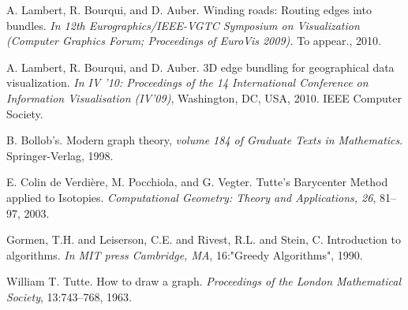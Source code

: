 \begin{thebibliography}{}

 A. Lambert, R. Bourqui, and D. Auber. Winding roads: Routing edges
into bundles. \emph{In 12th Eurographics/IEEE-VGTC Symposium on
Visualization (Computer Graphics Forum; Proceedings of EuroVis
2009).} To appear., 2010.

 A. Lambert, R. Bourqui, and D. Auber. 3D edge bundling for
geographical data visualization. \emph{In IV ’10: Proceedings of the 14
International Conference on Information Visualisation (IV’09)},
Washington, DC, USA, 2010. IEEE Computer Society.

 B. Bollob's. Modern graph theory, \emph{volume 184 of Graduate Texts in Mathematics}. Springer-Verlag, 1998.

 E. Colin de Verdière, M. Pocchiola, and G. Vegter. Tutte's Barycenter Method applied to Isotopies. \emph{Computational Geometry: Theory and Applications, 26}, 81–97, 2003.

 Gormen, T.H. and Leiserson, C.E. and Rivest, R.L. and Stein, C. Introduction to algorithms. \emph{In MIT press Cambridge, MA}, 16:"Greedy Algorithms", 1990.

 William T. Tutte. How to draw a graph. \emph{Proceedings of the London Mathematical Society}, 13:743–768, 1963.





   
\end{thebibliography}
